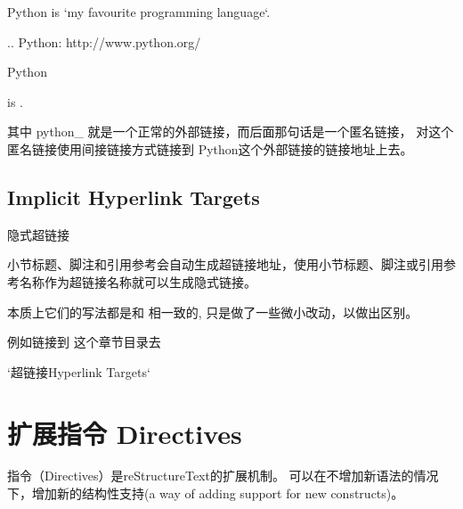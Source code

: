\documentclass[a4paper,10pt,english]{sphinxmanual}
\begin{document}
\sphinxAtStartPar
{}

\begin{sphinxVerbatim}[commandchars=\\\{\}]
Python\PYGZus{} is `my favourite
programming language`\PYGZus{}\PYGZus{}.

.. \PYGZus{}Python: http://www.python.org/

\PYGZus{}\PYGZus{} Python\PYGZus{}
\end{sphinxVerbatim}

\sphinxAtStartPar
{}

\sphinxAtStartPar
{} is .

\sphinxAtStartPar
其中 python\_ 就是一个正常的外部链接，而后面那句话是一个匿名链接，
对这个匿名链接使用间接链接方式链接到 Python这个外部链接的链接地址上去。


\subsection{Implicit Hyperlink Targets}
\label{\detokenize{reStructureText_syntax:implicit-hyperlink-targets}}
\sphinxAtStartPar
隐式超链接

\sphinxAtStartPar
小节标题、脚注和引用参考会自动生成超链接地址，使用小节标题、脚注或引用参考名称作为超链接名称就可以生成隐式链接。

\sphinxAtStartPar
本质上它们的写法都是和 {\hyperref[\detokenize{reStructureText_syntax:external-hyperlink-targets}]{}} 相一致的, 只是做了一些微小改动，以做出区别。

\sphinxAtStartPar
例如链接到 {\hyperref[\detokenize{reStructureText_syntax:hyperlink-targets}]{}} 这个章节目录去

\begin{sphinxVerbatim}[commandchars=\\\{\}]
`超链接Hyperlink Targets`\PYGZus{}
\end{sphinxVerbatim}


\section{扩展指令 Directives}
\label{\detokenize{reStructureText_syntax:directives}}
\sphinxAtStartPar
指令（Directives）是reStructureText的扩展机制。
可以在不增加新语法的情况下，增加新的结构性支持(a way of adding support for new constructs)。
\end{document}
